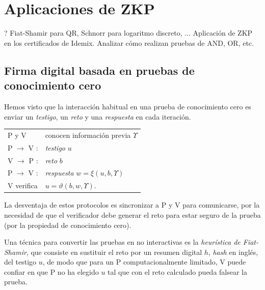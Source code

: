 \chapter{Aplicaciones de ZKP}\label{ch:aplicaciones} 


?
Fiat-Shamir para QR, Schnorr para logaritmo discreto, ...
Aplicación de ZKP en los certificados de Idemix. Analizar cómo realizan pruebas de AND, OR, etc.








\section{Firma digital basada en pruebas de conocimiento cero}

Hemos visto que la interacción habitual en una prueba de conocimiento cero es enviar un \textit{testigo}, un \textit{reto} y una \textit{respuesta} en cada iteración.

\begin{center}
	\begin{tabular}{ll}
		P y V & conocen información previa $\Upsilon$
		\\
		P $\rightarrow$ V :& \textit{testigo} $u$
		\\
		V $\rightarrow$ P :& \textit{reto} $b$
		\\
		P $\rightarrow$ V :& \textit{respuesta} $w = \xi(u,b,\Upsilon)$
		\\
		V verifica & $u=\vartheta(b,w,\Upsilon)$.
	\end{tabular}
\end{center}

\hfil

La desventaja de estos protocolos es sincronizar a P y V para comunicarse, por la necesidad de que el verificador debe generar el reto para estar seguro de la prueba (por la propiedad de conocimiento cero).

Una técnica para convertir las pruebas en no interactivas es la \textit{heurística de Fiat-Shamir}, que consiste en sustituir el reto por un resumen digital $h$, \textit{hash} en inglés, del testigo $u$, de modo que para un P computacionalmente limitado, V puede confiar en que P no ha elegido $u$ tal que con el reto calculado pueda falsear la prueba.

